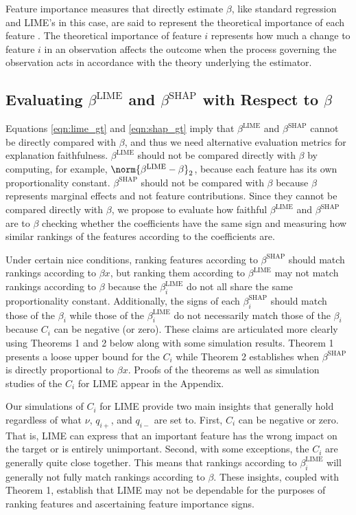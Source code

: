             Feature importance measures that directly estimate $\beta$, like standard regression and LIME's in this case, are said to represent the theoretical importance of each feature \citep{AchenChristopherH1982Iaur}. The theoretical importance of feature $i$ represents how much a change to feature $i$ in an observation affects the outcome when the process governing the observation acts in accordance with the theory underlying the estimator.

\subsection{Evaluating $\beta^{\text{LIME}}$ and $\beta^{\text{SHAP}}$ with Respect to $\beta$}
            Equations \ref{eqn:lime_gt} and \ref{eqn:shap_gt} imply that $\beta^{\text{LIME}}$ and $\beta^{\text{SHAP}}$ cannot be directly compared with $\beta$, and thus we need alternative evaluation metrics for explanation faithfulness. $\beta^{\text{LIME}}$ should not be compared directly with $\beta$ by computing, for example, $\norm{\beta^{\text{LIME}} - \beta}_2$, because each feature has its own proportionality constant. $\beta^{\text{SHAP}}$ should not be compared with $\beta$ because $\beta$ represents marginal effects and not feature contributions. Since they cannot be compared directly with $\beta$, we propose to evaluate how faithful $\beta^{\text{LIME}}$ and $\beta^{\text{SHAP}}$ are to $\beta$ checking whether the coefficients have the same sign and measuring how similar rankings of the features according to the coefficients are. 

            Under certain nice conditions, ranking features according to $\beta^{\text{SHAP}}$ should match rankings according to $\beta x$, but ranking them according to $\beta^{\text{LIME}}$ may not match rankings according to $\beta$ because the $\beta^{\text{LIME}}_i$ do not all share the same proportionality constant. Additionally, the signs of each $\beta^{\text{SHAP}}_i$ should match those of the $\beta_i$ while those of the $\beta^{\text{LIME}}_i$ do not necessarily match those of the $\beta_i$ because $C_i$ can be negative (or zero). These claims are articulated more clearly using Theorems 1 and 2 below along with some simulation results. Theorem 1 presents a loose upper bound for the $C_i$ while Theorem 2 establishes when $\beta^{\text{SHAP}}$ is directly proportional to $\beta x$. Proofs of the theorems as well as simulation studies of the $C_i$ for LIME appear in the Appendix. 

            Our simulations of $C_i$ for LIME provide two main insights that generally hold regardless of what $\nu$, $q_{i+}$, and $q_{i-}$ are set to. First, $C_i$ can be negative or zero. That is, LIME can express that an important feature has the wrong impact on the target or is entirely unimportant. Second, with some exceptions, the $C_i$ are generally quite close together. This means that rankings according to $\beta^{\text{LIME}}_i$  will generally not fully match rankings according to $\beta$. These insights, coupled with Theorem 1, establish that LIME may not be dependable for the purposes of ranking features and ascertaining feature importance signs.

